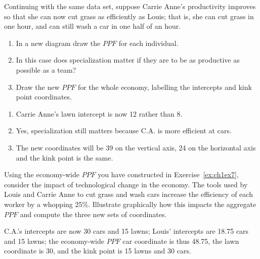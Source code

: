 \begin{enumialphparenastyle}
\begin{ex}\label{ex:ch1ex7}
Continuing with the same data set, suppose Carrie Anne's productivity improves so that she can now cut grass as efficiently as Louis; that is, she can cut grass in one hour, and can still wash a car in one half of an hour.
\begin{enumerate}
	\item	In a new diagram draw the $PPF$ for each individual.
	\item	In this case does specialization matter if they are to be as productive as possible as a team?
	\item	Draw the new $PPF$ for the whole economy, labelling the intercepts and kink point coordinates.
\end{enumerate}
\begin{sol}
\begin{enumerate}
	\item	Carrie Anne's lawn intercept is now 12 rather than 8.
	\item	Yes, specialization still matters because C.A. is more efficient at cars.
	\item	The new coordinates will be 39 on the vertical axis, 24 on the horizontal axis and the kink point is the same.
\end{enumerate}
\end{sol}
\end{ex}

\begin{ex}\label{ex:ch1ex8}
Using the economy-wide $PPF$ you have constructed in Exercise~\ref{ex:ch1ex7}, consider the impact of technological change in the economy. The tools used by Louis and Carrie Anne to cut grass and wash cars increase the efficiency of each worker by a whopping 25\%. Illustrate graphically how this impacts the aggregate $PPF$ and compute the three new sets of coordinates.
\begin{sol}
	C.A.'s intercepts are now 30 cars and 15 lawns; Louis' intercepts are 18.75 cars and 15 lawns; the economy-wide $PPF$ car coordinate is thus 48.75, the lawn coordinate is 30, and the kink point is 15 lawns and 30 cars.
	
\end{sol}
\end{ex}


\end{enumialphparenastyle}
